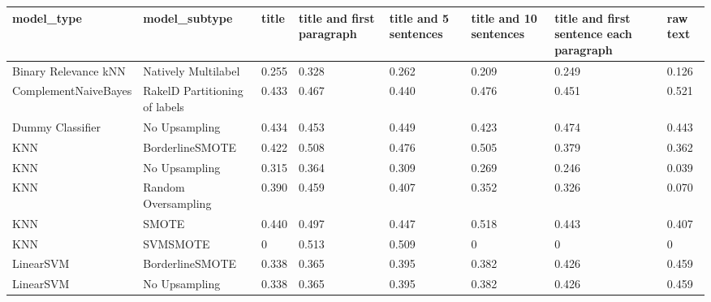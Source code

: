 \begin{tabular}{llllllll}
\toprule
                     model\_type &                 model\_subtype & title & title and first paragraph & title and 5 sentences & title and 10 sentences & title and first sentence each paragraph &  raw text \\
\midrule
           Binary Relevance kNN &           Natively Multilabel & 0.255 &                     0.328 &                 0.262 &                  0.209 &                                   0.249 &     0.126 \\
           ComplementNaiveBayes & RakelD Partitioning of labels & 0.433 &                     0.467 &                 0.440 &                  0.476 &                                   0.451 &     0.521 \\
               Dummy Classifier &                 No Upsampling & 0.434 &                     0.453 &                 0.449 &                  0.423 &                                   0.474 &     0.443 \\
                            KNN &               BorderlineSMOTE & 0.422 &                     0.508 &                 0.476 &                  0.505 &                                   0.379 &     0.362 \\
                            KNN &                 No Upsampling & 0.315 &                     0.364 &                 0.309 &                  0.269 &                                   0.246 &     0.039 \\
                            KNN &           Random Oversampling & 0.390 &                     0.459 &                 0.407 &                  0.352 &                                   0.326 &     0.070 \\
                            KNN &                         SMOTE & 0.440 &                     0.497 &                 0.447 &                  0.518 &                                   0.443 &     0.407 \\
                            KNN &                      SVMSMOTE &     0 &                     0.513 &                 0.509 &                      0 &                                       0 &         0 \\
                      LinearSVM &               BorderlineSMOTE & 0.338 &                     0.365 &                 0.395 &                  0.382 &                                   0.426 &     0.459 \\
                      LinearSVM &                 No Upsampling & 0.338 &                     0.365 &                 0.395 &                  0.382 &                                   0.426 &     0.459 \\

\end{tabular}
